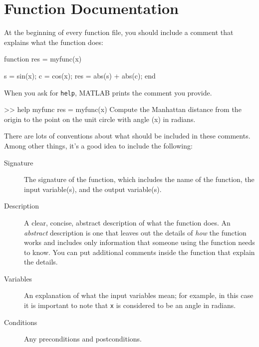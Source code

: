 

\section{Function Documentation}


At the beginning of every function file, you should include a comment that explains what the function does:


\begin{code}

function res = myfunc(x)

    s = sin(x);
    c = cos(x);
    res = abs(s) + abs(c);
end
\end{code}

When you ask for \lstinline{help}, MATLAB prints the comment you provide.


\begin{code}
>> help myfunc
  res = myfunc(x)
  Compute the Manhattan distance from the origin to the
  point on the unit circle with angle (x) in radians.
\end{code}

There are lots of conventions about what should be included
in these comments.  Among other things, it's a good idea to
include the following:

\begin{description}

\item [Signature] The signature of the function, which includes the name
of the function, the input variable(s), and the output variable(s).

\item [Description] A clear, concise, abstract description of what the function does.
An \emph{abstract} description is one that leaves out the
details of \emph{how} the function works and includes only information
that someone  using the function needs to know.  You can put additional
comments inside the function that explain the details.

\item [Variables] An explanation of what the input variables mean; for example,
in this case it is important to note that \lstinline{x} is considered
to be an angle in radians.

\item [Conditions] Any preconditions and postconditions.

\end{description}

